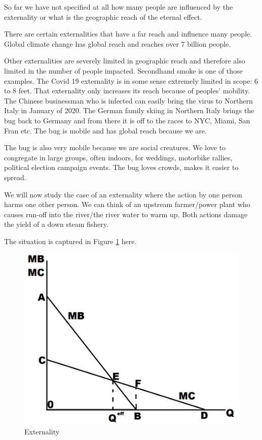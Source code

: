 \documentclass[
]{book}
\begin{document}
So far we have not specified at all how many people are influenced by the externality or what is the geographic reach of the eternal effect.

There are certain externalities that have a far reach and influence many people. Global climate change has global reach and reaches over 7 billion people.

Other externalities are severely limited in geographic reach and therefore also limited in the number of people impacted. Secondhand smoke is one of those examples. The Covid 19 externality is in some sense extremely limited in scope: 6 to 8 feet. That externality only increases its reach because of peoples' mobility. The Chinese businessman who is infected can easily bring the virus to Northern Italy in January of 2020. The German family skiing in Northern Italy brings the bug back to Germany and from there it is off to the races to NYC, Miami, San Fran etc. The bug is mobile and has global reach because we are.

The bug is also very mobile because we are social creatures. We love to congregate in large groups, often indoors, for weddings, motorbike rallies, political election campaign events. The bug loves crowds, makes it easier to spread.

We will now study the case of an externality where the action by one person harms one other person. We can think of an upstream farmer/power plant who causes run-off into the river/the river water to warm up. Both actions damage the yield of a down steam fishery.

The situation is captured in Figure \ref{fig:extfig4} here.

\begin{figure}

{\centering \includegraphics[width=0.75\linewidth]{img/externalities/extfig4} 

}

\caption{Externality}\label{fig:extfig4}
\end{figure}
\end{document}
